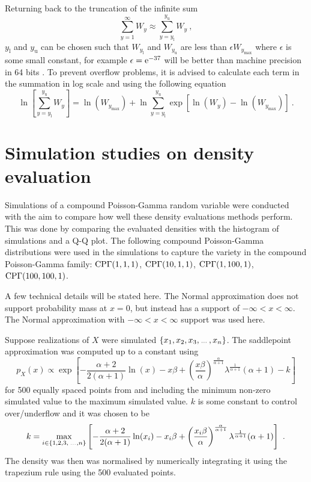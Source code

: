 Returning back to the truncation of the infinite sum
\begin{equation}
  \sum_{y=1}^\infty W_y \approx \sum_{y=y_\text{l}}^{y_\text{u}}W_y
  \ ,
\end{equation}
$y_\text{l}$ and $y_\text{u}$ can be chosen such that $W_{y_\text{l}}$ and $W_{y_\text{u}}$ are less than $\epsilon W_{y_\text{max}}$ where $\epsilon$ is some small constant, for example $\epsilon=\mathrm{e}^{-37}$ will be better than machine precision in 64 bits \citep{dunn2005series}. To prevent overflow problems, it is advised to calculate each term in the summation in log scale \citep{dunn2005series} and using the following equation
\begin{equation}
  \ln\left[
    \sum_{y=y_\text{l}}^{y_\text{u}}W_y
  \right]
  = 
  \ln\left(
    W_{y_\text{max}}
  \right)
  +\ln\sum_{y=y_\text{l}}^{y_\text{u}}
  \exp\left[
    \ln\left(W_y\right)-\ln\left(W_{y_\text{max}}\right)
  \right]
  \ .
\end{equation}

\section{Simulation studies on density evaluation}

Simulations of a compound Poisson-Gamma random variable were conducted with the aim to compare how well these density evaluations methods perform. This was done by comparing the evaluated densities with the histogram of simulations and a Q-Q plot. The following compound Poisson-Gamma distributions were used in the simulations to capture the variety in the compound Poisson-Gamma family: $\operatorname{CP\Gamma}(1,1,1)$, $\operatorname{CP\Gamma}(10,1,1)$, $\operatorname{CP\Gamma}(1,100,1)$, $\operatorname{CP\Gamma}(100,100,1)$.

A few technical details will be stated here. The Normal approximation does not support probability mass at $x=0$, but instead has a support of $-\infty<x<\infty$. The Normal approximation with $-\infty<x<\infty$ support was used here.

Suppose realizations of $X$ were simulated $\left\{x_1,x_2,x_3,\dotdotdot,x_n\right\}$. The saddlepoint approximation was computed up to a constant using
\begin{equation}
	p_X(x) \propto
	\exp\left[
		-\frac{\alpha+2}{2(\alpha+1)}
		\ln(x)
		-x\beta
		+\left(
		\frac{x\beta}{\alpha}
		\right)^{\frac{\alpha}{\alpha+1}}\lambda^{\frac{1}{\alpha+1}}(\alpha+1) - k
	\right]
\end{equation}
for 500 equally spaced points from and including the minimum non-zero simulated value to the maximum simulated value. $k$ is some constant to control over/underflow and it was chosen to be
\begin{equation}
	k =
	\max_{i\in\left\{1,2,3,\dotdotdot,n\right\}}
	\left[
		-\frac{\alpha+2}{2(\alpha+1)}
		\ln(x_i)
		-x_i\beta
		+\left(
			\frac{x_i\beta}{\alpha}
		\right)^{\frac{\alpha}{\alpha+1}}\lambda^{\frac{1}{\alpha+1}}(\alpha+1)
	\right]
	\ .
\end{equation}
The density was then was normalised by numerically integrating it using the trapezium rule using the 500 evaluated points.

